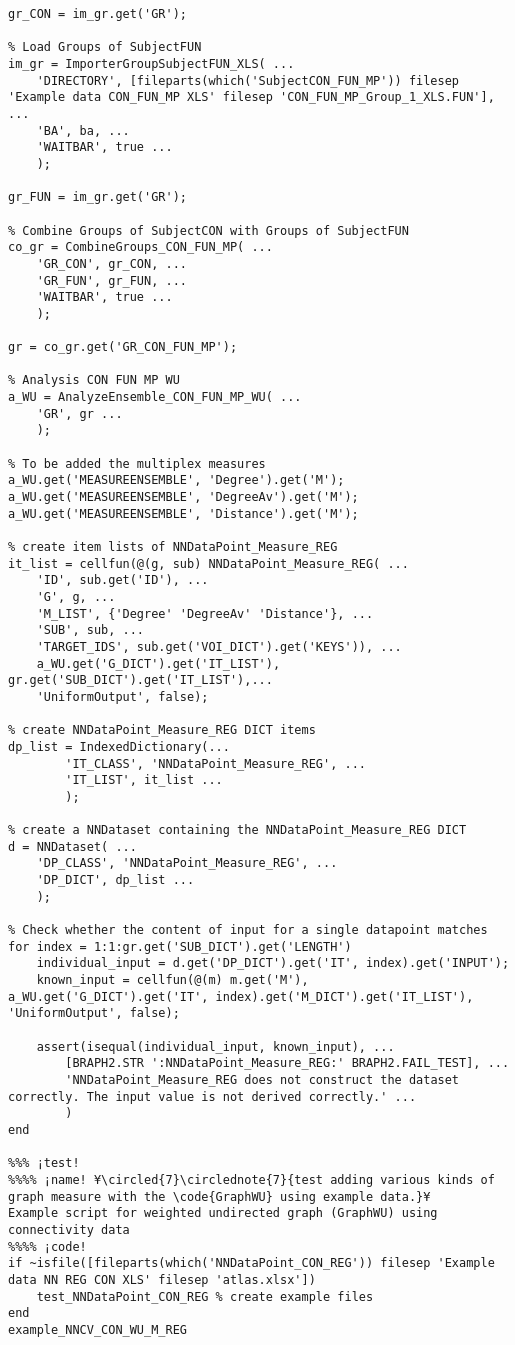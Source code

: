 \documentclass{tufte-handout}
\begin{document}
\begin{lstlisting}
gr_CON = im_gr.get('GR');

% Load Groups of SubjectFUN
im_gr = ImporterGroupSubjectFUN_XLS( ...
    'DIRECTORY', [fileparts(which('SubjectCON_FUN_MP')) filesep 'Example data CON_FUN_MP XLS' filesep 'CON_FUN_MP_Group_1_XLS.FUN'], ...
    'BA', ba, ...
    'WAITBAR', true ...
    );

gr_FUN = im_gr.get('GR');

% Combine Groups of SubjectCON with Groups of SubjectFUN
co_gr = CombineGroups_CON_FUN_MP( ...
    'GR_CON', gr_CON, ...
    'GR_FUN', gr_FUN, ...
    'WAITBAR', true ...
    );

gr = co_gr.get('GR_CON_FUN_MP');

% Analysis CON FUN MP WU
a_WU = AnalyzeEnsemble_CON_FUN_MP_WU( ...
    'GR', gr ...
    );

% To be added the multiplex measures
a_WU.get('MEASUREENSEMBLE', 'Degree').get('M');
a_WU.get('MEASUREENSEMBLE', 'DegreeAv').get('M');
a_WU.get('MEASUREENSEMBLE', 'Distance').get('M');

% create item lists of NNDataPoint_Measure_REG
it_list = cellfun(@(g, sub) NNDataPoint_Measure_REG( ...
    'ID', sub.get('ID'), ...
    'G', g, ...
    'M_LIST', {'Degree' 'DegreeAv' 'Distance'}, ...
    'SUB', sub, ...
    'TARGET_IDS', sub.get('VOI_DICT').get('KEYS')), ...
    a_WU.get('G_DICT').get('IT_LIST'), gr.get('SUB_DICT').get('IT_LIST'),...
    'UniformOutput', false);

% create NNDataPoint_Measure_REG DICT items
dp_list = IndexedDictionary(...
        'IT_CLASS', 'NNDataPoint_Measure_REG', ...
        'IT_LIST', it_list ...
        );

% create a NNDataset containing the NNDataPoint_Measure_REG DICT
d = NNDataset( ...
    'DP_CLASS', 'NNDataPoint_Measure_REG', ...
    'DP_DICT', dp_list ...
    );

% Check whether the content of input for a single datapoint matches
for index = 1:1:gr.get('SUB_DICT').get('LENGTH')
    individual_input = d.get('DP_DICT').get('IT', index).get('INPUT');
    known_input = cellfun(@(m) m.get('M'), a_WU.get('G_DICT').get('IT', index).get('M_DICT').get('IT_LIST'), 'UniformOutput', false);

    assert(isequal(individual_input, known_input), ...
        [BRAPH2.STR ':NNDataPoint_Measure_REG:' BRAPH2.FAIL_TEST], ...
        'NNDataPoint_Measure_REG does not construct the dataset correctly. The input value is not derived correctly.' ...
        )
end

%%% ¡test!
%%%% ¡name! ¥\circled{7}\circlednote{7}{test adding various kinds of graph measure with the \code{GraphWU} using example data.}¥
Example script for weighted undirected graph (GraphWU) using connectivity data
%%%% ¡code!
if ~isfile([fileparts(which('NNDataPoint_CON_REG')) filesep 'Example data NN REG CON XLS' filesep 'atlas.xlsx'])
    test_NNDataPoint_CON_REG % create example files
end
example_NNCV_CON_WU_M_REG


\end{lstlisting}
\end{document}
